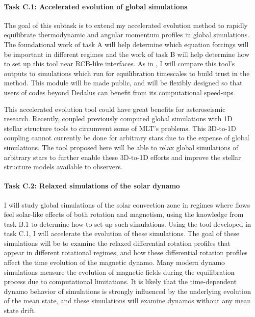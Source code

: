 \documentclass[11pt, preprint]{aastex}
\begin{document}
\vspace{-0.5cm}
\paragraph{Task C.1: Accelerated evolution of global simulations}
\label{sct:taskC1}
The goal of this subtask is to extend my accelerated evolution method to rapidly equilibrate thermodynamic and angular momentum profiles in global simulations.
The foundational work of task A will help determine which equation forcings will be important in different regimes and the work of task B will help determine how to set up this tool near RCB-like interfaces.
As in \citet{anders&all2018}, I will compare this tool's outputs to simulations which run for equilibration timescales to build trust in the method.
This module will be made public, and will be flexibly designed so that users of codes beyond Dedalus can benefit from its computational speed-ups.

This accelerated evolution tool could have great benefits for asteroseismic research.
Recently, \citet{jorgensen&weiss2019} coupled previously computed global simulations with 1D stellar structure tools to circumvent some of MLT's problems.
This 3D-to-1D coupling cannot currently be done for arbitrary stars due to the expense of global simulations. 
The tool proposed here will be able to relax global simulations of arbitrary stars to further enable these 3D-to-1D efforts and improve the stellar structure models available to observers.


\paragraph{Task C.2: Relaxed simulations of the solar dynamo}
\label{sct:taskC2}
I will study global simulations of the solar convection zone in regimes where flows feel solar-like effects of both rotation and magnetism, using the knowledge from task B.1 to determine how to set up such simulations.
Using the tool developed in task C.1, I will accelerate the evolution of these simulations.
The goal of these simulations will be to examine the relaxed differential rotation profiles that appear in different rotational regimes, and how these differential rotation profiles affect the time evolution of the magnetic dynamo.
Many modern dynamo simulations measure the evolution of magnetic fields during the equilibration process due to computational limitations.
It is likely that the time-dependent dynamo behavior of simulations is strongly influenced by the underlying evolution of the mean state, and these simulations will examine dynamos without any mean state drift.
\end{document}
